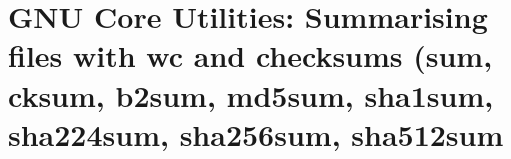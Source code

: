 
\chapter{GNU Core Utilities: Summarising files with wc and checksums (sum, cksum, b2sum, md5sum, sha1sum, sha224sum, sha256sum, sha512sum}
